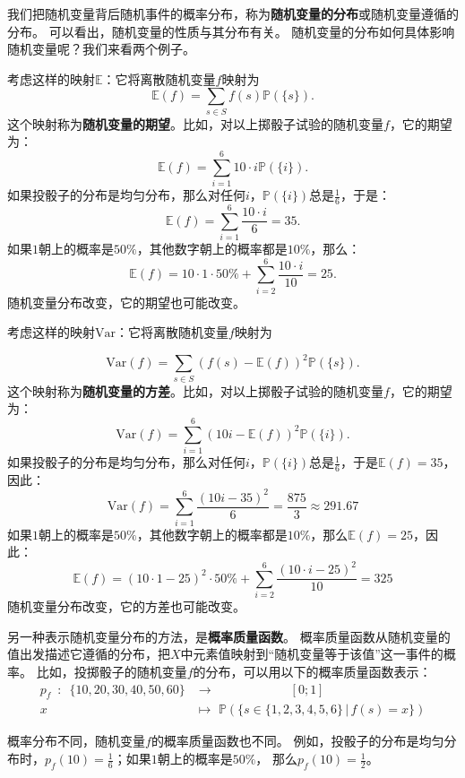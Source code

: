 \documentclass[12pt,UTF8]{ctexbook}
\begin{document}
我们把随机变量背后随机事件的概率分布，称为\textbf{随机变量的分布}或随机变量遵循的分布。
可以看出，随机变量的性质与其分布有关。
随机变量的分布如何具体影响随机变量呢？我们来看两个例子。
\begin{ex}
    考虑这样的映射$\mathbb{E}$：它将离散随机变量$f$映射为
    $$ \mathbb{E}(f) = \sum_{s\in S} f(s) \mathbb{P}(\{s\}).$$
    这个映射称为\textbf{随机变量的期望}。比如，对以上掷骰子试验的随机变量$f$，它的期望为：
    $$ \mathbb{E}(f) = \sum_{i=1}^6 10\cdot i \mathbb{P}(\{i\}).$$
    如果投骰子的分布是均匀分布，那么对任何$i$​，$\mathbb{P}(\{i\})$​总是$\frac{1}{6}$​，于是：
    $$ \mathbb{E}(f) = \sum_{i=1}^6 \frac{10\cdot i}{6} = 35. $$
    如果$1$朝上的概率是$50\%$，其他数字朝上的概率都是$10\%$​，那么：
    $$ \mathbb{E}(f) = 10\cdot 1\cdot 50\% + \sum_{i=2}^6 \frac{10\cdot i}{10} = 25. $$
    随机变量分布改变，它的期望也可能改变。
\end{ex}
\begin{ex}
    考虑这样的映射$\mathrm{Var}$：它将离散随机变量$f$映射为

    $$ \mathrm{Var}(f) = \sum_{s\in S} \left(f(s) - \mathbb{E}(f)\right)^2 \mathbb{P}(\{s\}).$$
    这个映射称为\textbf{随机变量的方差}。比如，对以上掷骰子试验的随机变量$f$，它的期望为：
    $$ \mathrm{Var}(f) = \sum_{i=1}^6 \left(10i - \mathbb{E}(f)\right)^2 \mathbb{P}(\{i\}).$$
    如果投骰子的分布是均匀分布，那么对任何$i$，$\mathbb{P}(\{i\})$总是$\frac{1}{6}$，于是$\mathbb{E}(f) = 35$，因此：
    $$\mathrm{Var}(f) = \sum_{i=1}^6 \frac{\left(10i - 35\right)^2}{6} = \frac{875}{3} \approx 291.67$$    
    如果$1$朝上的概率是$50\%$，其他数字朝上的概率都是$10\%$，那么$\mathbb{E}(f) = 25$，因此：    
    $$ \mathbb{E}(f) = (10\cdot 1 - 25)^2\cdot 50\% + \sum_{i=2}^6 \frac{(10\cdot i - 25)^2}{10} = 325 $$
    随机变量分布改变，它的方差也可能改变。
\end{ex}

另一种表示随机变量分布的方法，是\textbf{概率质量函数}。
概率质量函数从随机变量的值出发描述它遵循的分布，把$X$中元素值映射到“随机变量等于该值”这一事件的概率。
比如，投掷骰子的随机变量$f$的分布，可以用以下的概率质量函数表示：
\begin{align*}
p_f \,\,\, : \,\,\,  \{10,20,30,40,50,60\} &\rightarrow \qquad\qquad\qquad [0; 1]  \\
  x\qquad\qquad &\mapsto \,\, \mathbb{P}(\{s \in \{1,2,3,4,5,6\} \,|\, f(s) = x\})  
\end{align*}

概率分布不同，随机变量$f$的概率质量函数也不同。
例如，投骰子的分布是均匀分布时，$p_f(10) = \frac{1}{6}$；如果$1$朝上的概率是$50\%$，
那么$p_f(10) = \frac{1}{2}$。
\end{document}
